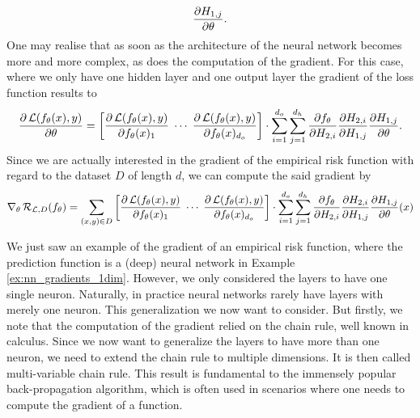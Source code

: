 \begin{example}
\begin{enumerate}
\begin{align*}
\frac{\partial H_{1,j}}{\partial \theta}.
\end{align*}
One may realise that as soon as the architecture of the neural network becomes more and more complex, as does the computation of the gradient. For this case, where we only have one hidden layer and one output layer the gradient of the loss function results to
\begin{align*}
\frac{\partial \operatorname{\mathcal{L}}(f_{\theta}(x), y)}{\partial \theta} = \left[\begin{matrix}
\displaystyle\frac{\partial \operatorname{\mathcal{L}}(f_{\theta}(x), y)}{\partial f_{\theta}(x)_1}\; \cdots\; \frac{\partial \operatorname{\mathcal{L}}(f_{\theta}(x), y)}{\partial f_{\theta}(x)_{d_o}}
\end{matrix} \right] \cdot \sum_{i=1}^{d_o} \sum_{j=1}^{d_h} \frac{\partial f_{\theta}}{\partial H_{2,i}} \frac{\partial H_{2,i}}{\partial H_{1,j}}
\frac{\partial H_{1,j}}{\partial \theta}.
\end{align*}
Since we are actually interested in the gradient of the empirical risk function with regard to the dataset $D$ of length $d$, we can compute the said gradient by
\begin{align*}
\nabla_{\theta} \operatorname{\mathcal{R}}_{\operatorname{\mathcal{L}}, D} (f_{\theta}) = \sum_{(x, y)\in D} \left[\begin{matrix}
\displaystyle\frac{\partial \operatorname{\mathcal{L}}(f_{\theta}(x), y)}{\partial f_{\theta}(x)_1}\; \cdots\; \frac{\partial \operatorname{\mathcal{L}}(f_{\theta}(x), y)}{\partial f_{\theta}(x)_{d_o}}
\end{matrix} \right] \cdot \sum_{i=1}^{d_o} \sum_{j=1}^{d_h} \frac{\partial f_{\theta}}{\partial H_{2,i}} \frac{\partial H_{2,i}}{\partial H_{1,j}}
\frac{\partial H_{1,j}}{\partial \theta} (x)
\end{align*}
\fi
\end{enumerate}
\end{example}

We just saw an example of the gradient of an empirical risk function, where the prediction function is a (deep) neural network in Example \ref{ex:nn_gradients_1dim}. However, we only considered the layers to have one single neuron. Naturally, in practice neural networks rarely have layers with merely one neuron. This generalization we now want to consider. But firstly, we note that the computation of the gradient relied on the chain rule, well known in calculus. Since we now want to generalize the layers to have more than one neuron, we need to extend the chain rule to multiple dimensions. It is then called multi-variable chain rule. This result is fundamental to the immensely popular back-propagation algorithm, which is often used in scenarios where one needs to compute the gradient of a function.

